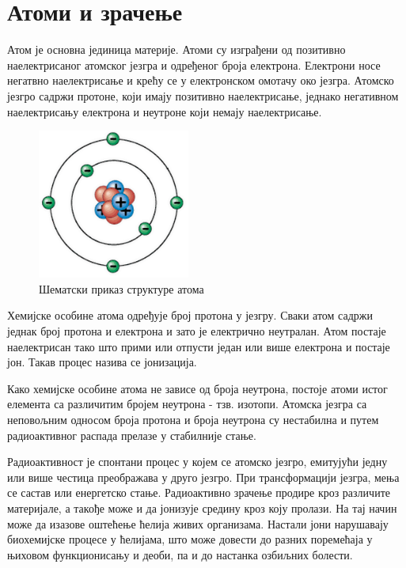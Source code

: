 \documentclass[12pt,a4paper,serbian,oneside]{book}
\begin{document}
\section{Атоми и зрачење}

Атом је основна јединица материје. Атоми су изграђени од позитивно наелектрисаног атомског језгра и одређеног броја електрона. Електрони носе негатвно наелектрисање и крећу се у електронском омотачу око језгра. Атомско језгро садржи протоне, који имају позитивно наелектрисање, једнако негативном наелектрисању електрона и неутроне који немају наелектрисање. 

\begin{figure}[h]
\begin{center}
\leavevmode
\includegraphics[width=50mm]{images/atom.png}
\end{center}
\caption{Шематски приказ структуре атома}
\label{fig:atom}
\end{figure}

Хемијске особине атома одређује број протона у језгру. Сваки атом садржи једнак број протона и електрона и зато је електрично неутралан.  Атом постаје наелектрисан тако што прими или отпусти један или више електрона и постаје јон. Такав процес назива се јонизација.

Како хемијске особине атома не зависе од броја неутрона, постоје атоми истог елемента са различитим бројем неутрона - тзв. изотопи. Атомска језгра са неповољним односом броја протона и броја неутрона су нестабилна и путем радиоактивног распада прелазе у стабилније стање.

Радиоактивност је спонтани процес у којем се атомско језгро, емитујући једну или више честица преображава у друго језгро. При трансформацији језгра, мења се састав или енергетско стање. Радиоактивно зрачење продире кроз различите материјале, а такође може и да јонизује средину кроз коју пролази. На тај начин може да изазове оштећење ћелија живих организама. Настали јони нарушавају биохемијске процесе у ћелијама, што може довести до разних поремећаја у њиховом функционисању и деоби, па и до настанка озбиљних болести.
\end{document}
